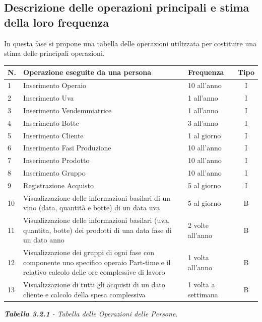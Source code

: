 \documentclass{article}
\begin{document}
\subsection{Descrizione delle operazioni principali e stima della loro frequenza} 
In questa fase si propone una tabella delle operazioni utilizzata per costituire una stima delle principali operazioni.\\
\newline
\newline
\begin{tabular}{p{} |p{}| p{}| c}\hline
    \textbf{N.} & \textbf{Operazione eseguite da una persona} & \textbf{Frequenza}  & \textbf{Tipo} \\\hline
    1&Inserimento Operaio & 10 all'anno & I \\\hline
    2&Inserimento Uva & 1 all'anno & I\\\hline
    3&Inserimento Vendemmiatrice & 1 all'anno & I\\\hline
    4&Inserimento Botte & 3 all'anno & I\\\hline
    5&Inserimento Cliente & 1 al giorno& I\\\hline
    6&Inserimento Fasi Produzione & 10 all'anno & I\\\hline
    7&Inserimento Prodotto & 10 all'anno &I \\\hline
    8&Inserimento Gruppo & 10 all'anno  &I \\\hline
    9&Registrazione Acquisto & 5 al giorno & I \\\hline
    10&Visualizzazione delle informazioni basilari di un vino (data, quantità e botte) di un data uva &5 al giorno & B\\\hline
    11&Visualizzazione delle informazioni basilari (uva, quantita, botte) dei prodotti di una data fase di un dato anno& 2 volte all'anno & B\\\hline
    12&Visualizzazione dei gruppi di ogni fase con componente uno specifico operaio Part-time e il relativo calcolo delle ore complessive di lavoro& 1 volta all'anno&B\\\hline
    13&Visualizzazione di tutti gli acquisti di un dato cliente e calcolo della spesa complessiva & 1 volta a settimana&B\\\hline
\end{tabular}
\newline
\textit{\textbf{Tabella 3.2.1}  - Tabella delle Operazioni delle Persone.}
\newline
\newline
\end{document}

